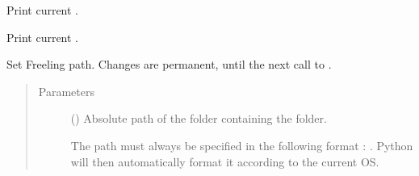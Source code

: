\documentclass[letterpaper,10pt,english]{sphinxmanual}
\begin{document}
\begin{fulllineitems}
\label{\detokenize{configuration:loacore.conf.check_freeling_path}}
Print current .

\end{fulllineitems}


\begin{fulllineitems}
\label{\detokenize{configuration:loacore.conf.check_lang}}
Print current .

\end{fulllineitems}


\begin{fulllineitems}
\label{\detokenize{configuration:loacore.conf.set_freeling_path}}
Set Freeling path.
Changes are permanent, until the next call to {\hyperref[\detokenize{configuration:loacore.conf.set_freeling_path}]{}}.
\begin{quote}\begin{description}
\item[{Parameters}] \leavevmode
{} () \textendash{} 
Absolute path of the folder containing the  folder.

The path must always be specified in the following format :  .
Python will then automatically format it according to the current OS.


\end{description}\end{quote}

\end{fulllineitems}

\end{document}
